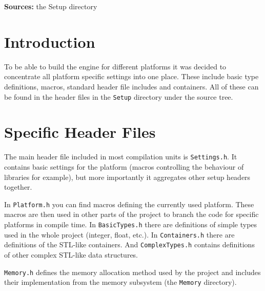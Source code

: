 \noindent\textbf{Sources:} the Setup directory


\section{Introduction}
To be able to build the engine for different platforms it was decided to concentrate all platform specific settings into one place. These include basic type definitions, macros, standard header file includes and containers. All of these can be found in the header files in the \verb'Setup' directory under the source tree.


\section{Specific Header Files}
The main header file included in most compilation units is \verb'Settings.h'. It contains basic settings for the platform (macros controlling the behaviour of libraries for example), but more importantly it aggregates other setup headers together.

In \verb'Platform.h' you can find macros defining the currently used platform. These macros are then used in other parts of the project to branch the code for specific platforms in compile time. In \verb'BasicTypes.h' there are definitions of simple types used in the whole project (integer, float, etc.). In \verb'Containers.h' there are definitions of the STL-like containers. And \verb'ComplexTypes.h' contains definitions of other complex STL-like data structures.

\verb'Memory.h' defines the memory allocation method used by the project and includes their implementation from the memory subsystem (the \verb'Memory' directory).


%


